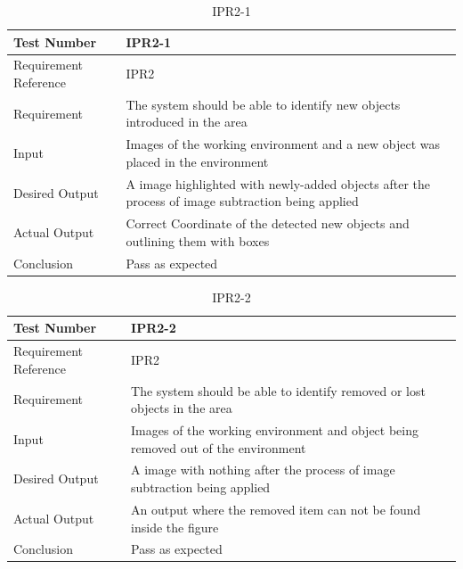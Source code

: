 \documentclass[12pt, titlepage]{article}
\begin{document}
\begin{table}[H]
\begin{center}
\begin{tabular}{|l | m{9cm}|}
\hline
  Test Number & IPR2-1\\
  \hline
  Requirement Reference & IPR2\\
  \hline
  Requirement &  The system should be able to identify new objects introduced in the area\\
  \hline
  Input & Images of the working environment and a new object was placed in the environment\\
  \hline
  Desired Output & A image highlighted with newly-added objects after the process of image subtraction being applied\\
  \hline
  Actual Output & Correct Coordinate of the detected new objects and outlining them with boxes\\
  \hline
  Conclusion & Pass as expected\\
  \hline
\end{tabular}
\end{center}   
\caption{IPR2-1}
\end{table}

\begin{table}[H]
\begin{center}
\begin{tabular}{|l | m{9cm}|}
\hline
  Test Number & IPR2-2\\
  \hline
  Requirement Reference & IPR2\\
  \hline
  Requirement & The system should be able to identify removed or lost objects in the area\\
  \hline
  Input & Images of the working environment and object being removed out of the environment\\
  \hline
  Desired Output & A image with nothing after the process of image subtraction being applied\\
  \hline
  Actual Output & An output where the removed item can not be found inside the figure\\
  \hline
  Conclusion & Pass as expected\\
  \hline
\end{tabular}
\end{center}   
\caption{IPR2-2}
\end{table}
\end{document}
